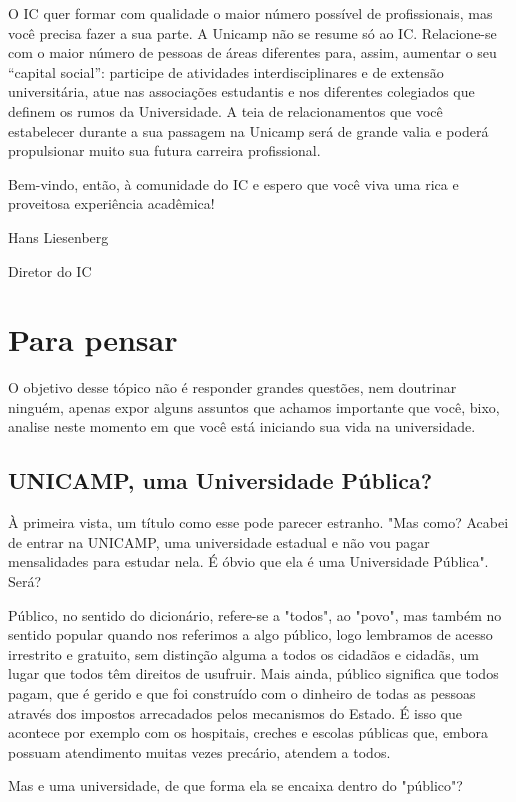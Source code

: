\documentclass[a4paper,10pt]{article}
\begin{document}
O IC quer formar com qualidade o maior número possível de profissionais, mas
você precisa fazer a sua parte.  A Unicamp não se resume só ao IC. Relacione-se
com o maior número de pessoas de áreas diferentes para, assim, aumentar o seu
“capital social”: participe de atividades interdisciplinares e de extensão
universitária, atue nas associações estudantis e nos diferentes colegiados que
definem os rumos da Universidade. A teia de relacionamentos que você estabelecer
durante a sua passagem na Unicamp será de grande valia e poderá propulsionar
muito sua futura carreira profissional.

Bem-vindo, então, à comunidade do IC e espero que você viva uma rica
e proveitosa experiência acadêmica!

Hans Liesenberg

Diretor do IC

\section{Para pensar}
O objetivo desse tópico não é responder grandes questões, nem doutrinar ninguém,
apenas expor alguns assuntos que achamos importante que você, bixo, analise
neste momento em que você está iniciando sua vida na universidade.

\subsection{UNICAMP, uma Universidade Pública?} À primeira vista, um título como
esse pode parecer estranho. "Mas como? Acabei de entrar na UNICAMP, uma
universidade estadual e não vou pagar mensalidades para estudar nela. É óbvio
que ela é uma Universidade Pública". Será?

Público, no sentido do dicionário, refere-se a "todos", ao "povo", mas também no
sentido popular quando nos referimos a algo público, logo lembramos de acesso
irrestrito e gratuito, sem distinção alguma a todos os cidadãos e cidadãs, um
lugar que todos têm direitos de usufruir. Mais ainda, público significa que
todos pagam, que é gerido e que foi construído com o dinheiro de todas as
pessoas através dos impostos arrecadados pelos mecanismos do Estado. É isso que
acontece por exemplo com os hospitais, creches e escolas públicas que, embora
possuam atendimento muitas vezes precário, atendem a todos.

Mas e uma universidade, de que forma ela se encaixa dentro do "público"?
\end{document}
